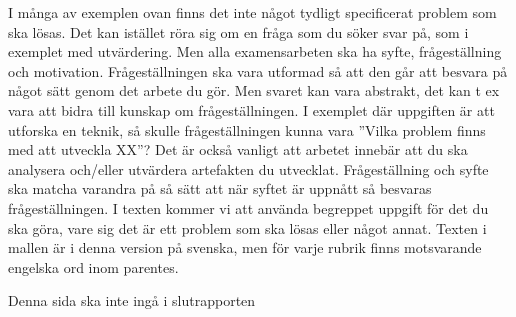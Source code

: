 I många av exemplen ovan finns det inte något tydligt specificerat problem som ska lösas. 
Det kan istället röra sig om en fråga som du söker svar på, som i exemplet med utvärdering.
Men alla examensarbeten ska ha syfte, frågeställning och motivation. 
Frågeställningen ska vara utformad så att den går att besvara på något sätt genom det arbete du gör.
Men svaret kan vara abstrakt, det kan t ex vara att bidra till kunskap om frågeställningen.
I exemplet där uppgiften är att utforska en teknik, så skulle frågeställningen kunna vara ”Vilka problem finns med att utveckla XX”?
Det är också vanligt att arbetet innebär att du ska analysera och/eller utvärdera artefakten du utvecklat.
Frågeställning och syfte ska matcha varandra på så sätt att när syftet är uppnått så besvaras frågeställningen.
I texten kommer vi att använda begreppet uppgift för det du ska göra, vare sig det är ett problem som ska lösas eller något annat.
Texten i mallen är i denna version på svenska, men för varje rubrik finns motsvarande engelska ord inom parentes.

Denna sida ska inte ingå i slutrapporten
\newpage